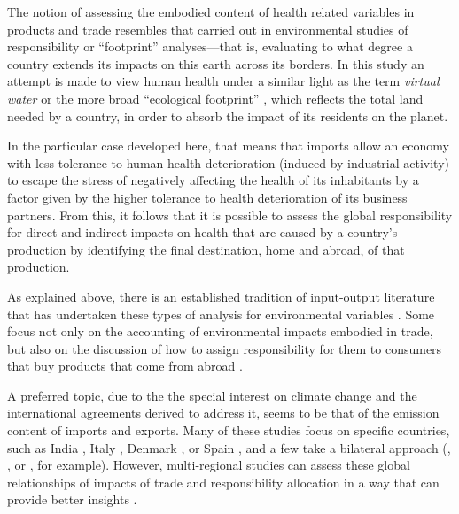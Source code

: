 \documentclass[a4paper,12pt, ]{article}
\begin{document}



The notion of assessing the embodied content of health related variables in products and trade resembles that carried out in environmental studies of responsibility or ``footprint'' analyses---that is, evaluating to what degree a country extends its impacts on this earth across its borders. In this study an attempt is made to view human health under a similar light as the term \textit{virtual water} \citep{allanvirtual2003} or the more broad ``ecological footprint'' \citep{reesrevisiting1996,wackernagelour1996}, which reflects the total land needed by a country, in order to absorb the impact of its residents on the planet.

In the particular case developed here, that means that imports allow an economy with less tolerance to human health deterioration (induced by industrial activity) to escape the stress of negatively affecting the health of its inhabitants by a factor given by the higher tolerance to health deterioration of its business partners. From this, it follows that it is possible to assess the global responsibility for direct and indirect impacts on health that are caused by a country's production by identifying the final destination, home and abroad, of that production.

As explained above, there is an established tradition of input-output literature that has undertaken these types of analysis for environmental variables \citep{wiedmannexamining2007}. Some focus not only on the accounting of environmental impacts embodied in trade, but also on the discussion of how to assign responsibility for them to consumers that buy products that come from abroad \citep{steengeinputoutput1999,munksgaardco22001,gallegoconsistent2005,rodriguesdesigning2006,lenzenshared2007,rodriguesconsumer2008}. 

A preferred topic, due to the the special interest on climate change and the international agreements derived to address it, seems to be that of the emission content of imports and exports. Many of these studies focus on specific countries, such as India 
\citep{dietzenbacherempirical2007}, Italy \citep{mongelliglobal2006}, Denmark \citep{munksgaardco22001}, or Spain  
\citep{sanchezcholizco22004,serranodietz2010}, and a few take a bilateral approach (\citealp{rheechange2006}, \citealp{ackermancarbon2007}, or \citealp{normaneconomic2007}, for example). However, multi-regional studies can assess these global relationships of impacts of trade and responsibility allocation in a way that can provide better insights \citep{wiedmannallocating2006,turnerexamining2007}.
\end{document}

